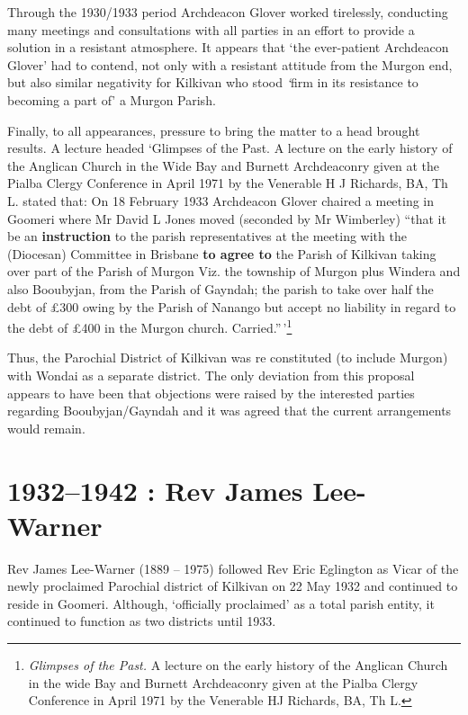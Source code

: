 Through the 1930/1933 period Archdeacon Glover worked tirelessly, conducting many meetings and consultations with all parties in an effort to provide a solution in a resistant atmosphere. It appears that `the ever-patient Archdeacon Glover' had to contend, not only with a resistant attitude from the Murgon end, but also similar negativity for Kilkivan who stood \emph{`}firm in its resistance to becoming a part of' a Murgon Parish.

Finally, to all appearances, pressure to bring the matter to a head brought results. A lecture headed `Glimpses of the Past. A lecture on the early history of the Anglican Church in the Wide Bay and Burnett Archdeaconry given at the Pialba Clergy Conference in April 1971 by the Venerable H J Richards, BA, Th L. stated that: On 18 February 1933 Archdeacon Glover chaired a meeting in Goomeri where Mr David L Jones moved (seconded by Mr Wimberley) ``that it be an \textbf{instruction} to the parish representatives at the meeting with the (Diocesan) Committee in Brisbane \textbf{to agree to} the Parish of Kilkivan taking over part of the Parish of Murgon Viz. the township of Murgon plus Windera and also Booubyjan, from the Parish of Gayndah; the parish to take over half the debt of £300 owing by the Parish of Nanango but accept no liability in regard to the debt of £400 in the Murgon church. Carried.''\,'\footnote{\emph{Glimpses of the Past.} A lecture on the early history of the Anglican Church in the wide Bay and Burnett Archdeaconry given at the Pialba Clergy Conference in April 1971 by the Venerable HJ Richards, BA, Th L.}

Thus, the Parochial District of Kilkivan was re constituted (to include Murgon) with Wondai as a separate district. The only deviation from this proposal appears to have been that objections were raised by the interested parties regarding Booubyjan/Gayndah and it was agreed that the current arrangements would remain.

\hypertarget{rev-james-lee-warner}{%
\chapter{1932--1942 : Rev James Lee-Warner}\label{rev-james-lee-warner}}

Rev James Lee-Warner (1889 -- 1975) followed Rev Eric Eglington as Vicar of the newly proclaimed Parochial district of Kilkivan on 22 May 1932 and continued to reside in Goomeri. Although, `officially proclaimed' as a total parish entity, it continued to function as two districts until 1933.

